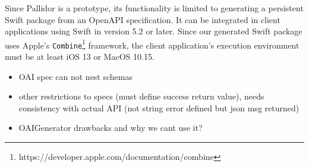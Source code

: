 Since Pallidor is a prototype, its functionality is limited to generating a persistent Swift package from an OpenAPI specification. It can be integrated in client applications using Swift in version 5.2 or later. Since our generated Swift package uses Apple's \texttt{Combine}\footnote{https://developer.apple.com/documentation/combine} framework, the client application's execution environment must be at least iOS 13 or MacOS 10.15. 

\begin{itemize}
	\item OAI spec can not nest schemas
	\item other restrictions to specs (must define success return value), needs consistency with actual API (not string error defined but json msg returned)
	\item OAIGenerator drawbacks and why we cant use it?
\end{itemize}

